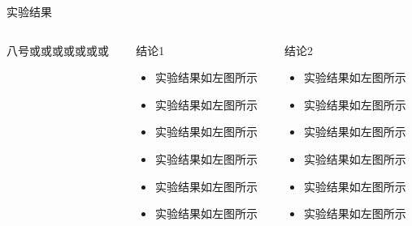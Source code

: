 \documentclass[8pt,compress,t,notheorems,noamsthm,notheorem,xcolor=x11names]{beamer}
\theoremstyle{nonumberplain}%
\theoremstyle{plain}
\begin{document}
\begin{frame}{实验结果}
\begin{columns}[T]
	\begin{column}{0.30\textwidth}
		八号或或或或或或或
	\end{column}
	\begin{column}{0.30\textwidth}
		\begin{Block}{结论1}
			\begin{itemize}
				\item 实验结果如左图所示
				\item 实验结果如左图所示
				\item 实验结果如左图所示
				\item 实验结果如左图所示
				\item 实验结果如左图所示
				\item 实验结果如左图所示
			\end{itemize}
		\end{Block}
	\end{column}
	
	\begin{column}{0.30\textwidth}
		\begin{block}{结论2}
			\begin{itemize}
				\item 实验结果如左图所示
				\item 实验结果如左图所示
				\item 实验结果如左图所示
				\item 实验结果如左图所示
				\item 实验结果如左图所示
				\item 实验结果如左图所示
			\end{itemize}
		\end{block}
	\end{column}
\end{columns}
\end{frame}


\end{document}

